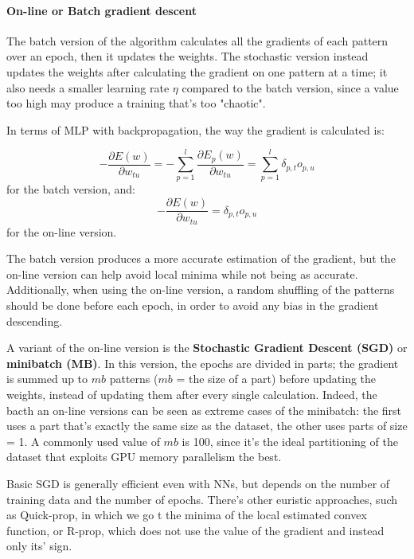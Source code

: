 \paragraph{On-line or Batch gradient descent}

The batch version of the algorithm calculates all the gradients of each pattern over an epoch, then it updates the weights. The stochastic version instead updates the weights after calculating the gradient on one pattern at a time; it also needs a smaller learning rate $\eta$ compared to the batch version, since a value too high may produce a training that's too "chaotic".

In terms of MLP with backpropagation, the way the gradient is calculated is:

\begin{equation*}
    - \dfrac{\partial E(w)}{\partial w_{tu}} = - \sum_{p=1}^l \dfrac{\partial E_p(w)}{\partial w_{tu}} = \sum_{p=1}^l \delta_{p,t} o_{p,u}
\end{equation*}
for the batch version, and:
\begin{equation*}
    - \dfrac{\partial E(w)}{\partial w_{tu}} = \delta_{p,t} o_{p,u}
\end{equation*}
for the on-line version.

The batch version produces a more accurate estimation of the gradient, but the on-line version can help avoid local minima while not being as accurate. Additionally, when using the on-line version, a random shuffling of the patterns should be done before each epoch, in order to avoid any bias in the gradient descending.

A variant of the on-line version is the \textbf{Stochastic Gradient Descent (SGD)} or \textbf{minibatch (MB)}. In this version, the epochs are divided in parts; the gradient is summed up to $mb$ patterns ($mb$ = the size of a part) before updating the weights, instead of updating them after every single calculation. Indeed, the bacth an on-line versions can be seen as extreme cases of the minibatch: the first uses a part that's exactly the same size as the dataset, the other uses parts of size = 1. A commonly used value of $mb$ is 100, since it's the ideal partitioning of the dataset that exploits GPU memory parallelism the best.

Basic SGD is generally efficient even with NNs, but depends on the number of training data and the number of epochs. There's other euristic approaches, such as Quick-prop, in which we go t the minima of the local estimated convex function, or R-prop, which does not use the value of the gradient and instead only its' sign.

